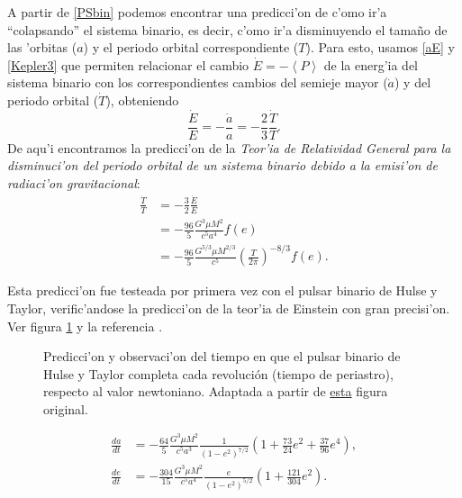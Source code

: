 A partir de \eqref{PSbin} podemos encontrar una predicci'on de c'omo ir'a ``colapsando'' el sistema binario, es decir, c'omo ir'a disminuyendo el tama\~no de las 'orbitas ($a$) y el periodo orbital correspondiente ($T$). Para esto, usamos \eqref{aE} y \eqref{Kepler3} que permiten relacionar el cambio $\dot{E}=-\left\langle P\right\rangle$ de la energ'ia del sistema binario con los correspondientes cambios del semieje mayor ($\dot{a}$) y del periodo orbital ($\dot{T}$), obteniendo
\begin{equation}
\frac{\dot{E}}{E}=-\frac{\dot{a}}{a}=-\frac{2}{3}\frac{\dot{T}}{T}.
\end{equation}
De aqu'i encontramos la predicci'on de la \textit{Teor'ia de Relatividad General para la disminuci'on del periodo orbital de un sistema binario debido a la emisi'on de radiaci'on gravitacional}:
\begin{align}
\frac{\dot{T}}{T} &= -\frac{3}{2}\frac{\dot{E}}{E} \\
&= -\frac{96}{5} \frac{G^3\mu M^2}{c^5a^4}f(e) \\
&= -\frac{96}{5} \frac{G^{5/3}\mu M^{2/3}}{c^5}\left(\frac{T}{2\pi}\right)^{-8/3}f(e).
\end{align}

Esta predicci'on fue testeada por primera vez con el pulsar binario de Hulse y Taylor, verific'andose la predicci'on de la teor'ia de Einstein con gran precisi'on. Ver figura \ref{fig:HT} y la referencia \cite{WT05}.
\begin{center}
\begin{figure}[H]
\centerline{}
\caption{Predicci'on y observaci'on del tiempo en que el pulsar binario de Hulse y Taylor completa cada revolución (tiempo de periastro), respecto al valor newtoniano. Adaptada a partir de \href{http://en.wikipedia.org/wiki/File:PSR_B1913\%2B16_period_shift_graph.svg}{esta} figura original.}
\label{fig:HT}
\end{figure}
\end{center}


\begin{align}
\frac{da}{dt} &= -\frac{64}{5}\frac{G^3\mu M^2}{c^5a^3}\frac{1}{\left(1-e^2\right)^{7/2}}\left(1+\frac{73}{24}e^2+\frac{37}{96}e^4\right) \label{dadt},\\
\frac{de}{dt} &= -\frac{304}{15}\frac{G^3\mu M^2}{c^5a^4}\frac{e}{\left(1-e^2\right)^{5/2}}\left(1+\frac{121}{304}e^2\right). \label{dedt}
\end{align}

